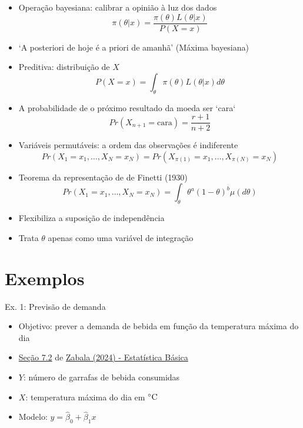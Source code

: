 \documentclass{beamer}\usepackage[]{graphicx}\usepackage[]{xcolor}
\begin{document}
\begin{frame}{\secname}
    \begin{itemize}
    \item Operação bayesiana: calibrar a opinião à luz dos dados \[ \pi(\theta|x) = \frac{\pi(\theta) L(\theta|x)}{P(X=x)} \]
    \pause
    \item `A posteriori de hoje é a priori de amanhã' (Máxima bayesiana)
    \pause
    \item Preditiva: distribuição de $X$ \[ P(X=x) = \int_{\theta} \pi(\theta) L(\theta|x) d\theta \]
    \pause
    \item A probabilidade de o próximo resultado da moeda ser `cara` \[ Pr(X_{n+1}=\textrm{cara}) = \frac{r+1}{n+2} \]
    \end{itemize}
\end{frame}

\begin{frame}{\secname}
    \begin{itemize}
    \item Variáveis permutáveis: a ordem das observações é indiferente \[ Pr(X_1=x_1, \ldots, X_N=x_N) = Pr(X_{\pi(1)}=x_1, \ldots, X_{\pi(N)}=x_N)  \]
    \pause
    \item Teorema da representação de de Finetti (1930) \[ Pr(X_1=x_1, \ldots, X_N=x_N) = \int_{\theta} \theta^a (1-\theta)^b \mu(d\theta) \]
    \pause
    \item Flexibiliza a suposição de independência
    \pause
    \item Trata $\theta$ apenas como uma variável de integração
    \end{itemize}
\end{frame}


\section{Exemplos}
\begin{frame}{Ex. 1: Previsão de demanda}
  \begin{itemize}
  \item Objetivo: prever a demanda de bebida em função da temperatura máxima do dia
  \item \href{https://filipezabala.com/eb/rls.html}{Seção 7.2} de \href{https://filipezabala.com/eb}{Zabala (2024) - Estatística Básica}
  \item $Y$: número de garrafas de bebida consumidas
  \item $X$: temperatura máxima do dia em $^{\circ}{\rm C}$
  \item Modelo: $y = \hat{\beta}_0 + \hat{\beta}_1 x$
  \end{itemize}
\end{frame}
\end{document}
